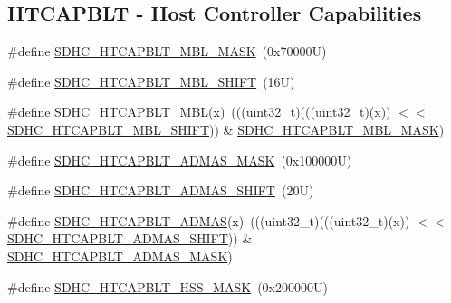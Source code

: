 \subsection*{H\+T\+C\+A\+P\+B\+LT -\/ Host Controller Capabilities}
\begin{DoxyCompactItemize}
\item 
\#define \mbox{\hyperlink{group___s_d_h_c___register___masks_gae49b97c8816777f7f7b5148f2b8ae5c1}{S\+D\+H\+C\+\_\+\+H\+T\+C\+A\+P\+B\+L\+T\+\_\+\+M\+B\+L\+\_\+\+M\+A\+SK}}~(0x70000\+U)
\item 
\#define \mbox{\hyperlink{group___s_d_h_c___register___masks_gac68ea213ff8629145f7ad40c9525cffe}{S\+D\+H\+C\+\_\+\+H\+T\+C\+A\+P\+B\+L\+T\+\_\+\+M\+B\+L\+\_\+\+S\+H\+I\+FT}}~(16\+U)
\item 
\#define \mbox{\hyperlink{group___s_d_h_c___register___masks_ga10ae4a906c4f6c75b8a4f87b1401114d}{S\+D\+H\+C\+\_\+\+H\+T\+C\+A\+P\+B\+L\+T\+\_\+\+M\+BL}}(x)~(((uint32\+\_\+t)(((uint32\+\_\+t)(x)) $<$$<$ \mbox{\hyperlink{group___s_d_h_c___register___masks_gac68ea213ff8629145f7ad40c9525cffe}{S\+D\+H\+C\+\_\+\+H\+T\+C\+A\+P\+B\+L\+T\+\_\+\+M\+B\+L\+\_\+\+S\+H\+I\+FT}})) \& \mbox{\hyperlink{group___s_d_h_c___register___masks_gae49b97c8816777f7f7b5148f2b8ae5c1}{S\+D\+H\+C\+\_\+\+H\+T\+C\+A\+P\+B\+L\+T\+\_\+\+M\+B\+L\+\_\+\+M\+A\+SK}})
\item 
\#define \mbox{\hyperlink{group___s_d_h_c___register___masks_gadb87583a1db8c53c61fdac8604e1ecc5}{S\+D\+H\+C\+\_\+\+H\+T\+C\+A\+P\+B\+L\+T\+\_\+\+A\+D\+M\+A\+S\+\_\+\+M\+A\+SK}}~(0x100000\+U)
\item 
\#define \mbox{\hyperlink{group___s_d_h_c___register___masks_ga6ceeb752d9ccad530b178fef829a9db6}{S\+D\+H\+C\+\_\+\+H\+T\+C\+A\+P\+B\+L\+T\+\_\+\+A\+D\+M\+A\+S\+\_\+\+S\+H\+I\+FT}}~(20\+U)
\item 
\#define \mbox{\hyperlink{group___s_d_h_c___register___masks_gabf99fc3861f08f450cb05c56e017a80a}{S\+D\+H\+C\+\_\+\+H\+T\+C\+A\+P\+B\+L\+T\+\_\+\+A\+D\+M\+AS}}(x)~(((uint32\+\_\+t)(((uint32\+\_\+t)(x)) $<$$<$ \mbox{\hyperlink{group___s_d_h_c___register___masks_ga6ceeb752d9ccad530b178fef829a9db6}{S\+D\+H\+C\+\_\+\+H\+T\+C\+A\+P\+B\+L\+T\+\_\+\+A\+D\+M\+A\+S\+\_\+\+S\+H\+I\+FT}})) \& \mbox{\hyperlink{group___s_d_h_c___register___masks_gadb87583a1db8c53c61fdac8604e1ecc5}{S\+D\+H\+C\+\_\+\+H\+T\+C\+A\+P\+B\+L\+T\+\_\+\+A\+D\+M\+A\+S\+\_\+\+M\+A\+SK}})
\item 
\#define \mbox{\hyperlink{group___s_d_h_c___register___masks_gabe87f7e9a2aa3b99012eaae8321aed89}{S\+D\+H\+C\+\_\+\+H\+T\+C\+A\+P\+B\+L\+T\+\_\+\+H\+S\+S\+\_\+\+M\+A\+SK}}~(0x200000\+U)

\end{DoxyCompactItemize}
